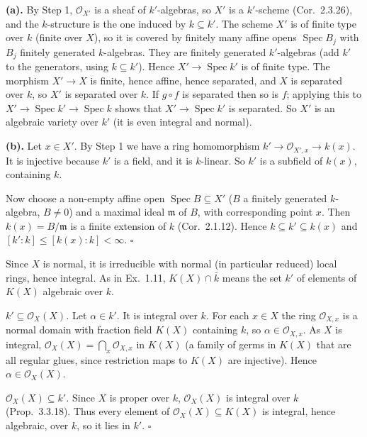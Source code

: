 \documentclass[11pt]{article}
\begin{document}
\textbf{(a).} By Step 1, $\mathcal O_{X'}$ is a sheaf of $k'$-algebras, so $X'$ is a $k'$-scheme (Cor.~2.3.26), and the $k$-structure is the one induced by $k\subseteq k'$. The scheme $X'$ is of finite type over $k$ (finite over $X$), so it is covered by finitely many affine opens $\operatorname{Spec}B_j$ with $B_j$ finitely generated $k$-algebras. They are finitely generated $k'$-algebras (add $k'$ to the generators, using $k\subseteq k'$). Hence $X'\to\operatorname{Spec}k'$ is of finite type. The morphism $X'\to X$ is finite, hence affine, hence separated, and $X$ is separated over $k$, so $X'$ is separated over $k$. If $g\circ f$ is separated then so is $f$; applying this to $X'\to\operatorname{Spec}k'\to\operatorname{Spec}k$ shows that $X'\to\operatorname{Spec}k'$ is separated. So $X'$ is an algebraic variety over $k'$ (it is even integral and normal).

\textbf{(b).} Let $x\in X'$. By Step 1 we have a ring homomorphism $k'\to\mathcal O_{X',x}\to k(x)$. It is injective because $k'$ is a field, and it is $k$-linear. So $k'$ is a subfield of $k(x)$, containing $k$.

Now choose a non-empty affine open $\operatorname{Spec}B\subseteq X'$ ($B$ a finitely generated $k$-algebra, $B\neq0$) and a maximal ideal $\mathfrak m$ of $B$, with corresponding point $x$. Then $k(x)=B/\mathfrak m$ is a finite extension of $k$ (Cor.~2.1.12). Hence $k\subseteq k'\subseteq k(x)$ and $[k':k]\le[k(x):k]<\infty$. \hfill$\square$

\pf
Since $X$ is normal, it is irreducible with normal (in particular reduced) local rings, hence integral. As in Ex.~1.11, $K(X)\cap\bar k$ means the set $k'$ of elements of $K(X)$ algebraic over $k$.

\emph{$k'\subseteq\mathcal O_X(X)$.} Let $\alpha\in k'$. It is integral over $k$. For each $x\in X$ the ring $\mathcal O_{X,x}$ is a normal domain with fraction field $K(X)$ containing $k$, so $\alpha\in\mathcal O_{X,x}$. As $X$ is integral, $\mathcal O_X(X)=\bigcap_x\mathcal O_{X,x}$ in $K(X)$ (a family of germs in $K(X)$ that are all regular glues, since restriction maps to $K(X)$ are injective). Hence $\alpha\in\mathcal O_X(X)$.

\emph{$\mathcal O_X(X)\subseteq k'$.} Since $X$ is proper over $k$, $\mathcal O_X(X)$ is integral over $k$ (Prop.~3.3.18). Thus every element of $\mathcal O_X(X)\subseteq K(X)$ is integral, hence algebraic, over $k$, so it lies in $k'$. \hfill$\square$
\end{document}
